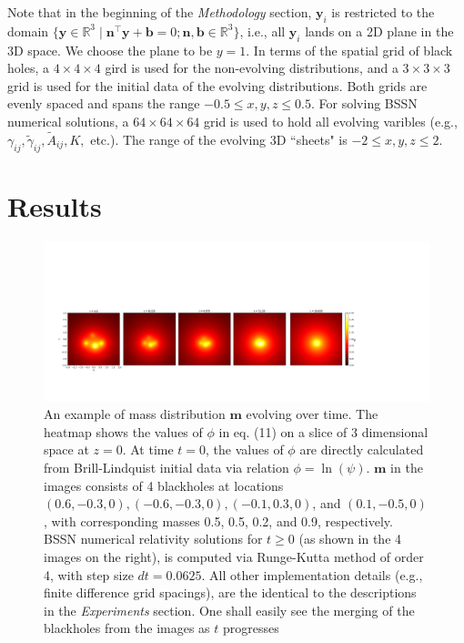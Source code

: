 \documentclass[conference]{IEEEtran}
\begin{document}
Note that in the beginning of the \textit{Methodology} section, $\mathbf{y}_i$ 
is restricted to the domain 
$\{ \mathbf{y} \in \mathbb{R}^3 \mid \mathbf{n}^\top \mathbf{y} + \mathbf{b} = 0; \mathbf{n}, \mathbf{b}\in \mathbb{R}^3\}$, i.e., 
all $\mathbf{y}_i$ lands on a 2D plane in the 3D space. We choose the plane to be 
$y=1$. In terms of the spatial grid of black holes, a $4 \times 4 \times 4$ gird is used for 
the non-evolving distributions, and a $3 \times 3 \times 3$ grid is used for 
the initial data of the evolving distributions. Both grids are evenly spaced 
and spans the range $-0.5 \leq x, y, z \leq 0.5$. For solving BSSN numerical 
solutions, a $64 \times 64 \times 64$ grid is used to hold all evolving varibles 
(e.g., $\gamma_{ij}, \tilde{\gamma}_{ij}, \tilde{A}_{ij}, K,$ etc.). The range 
of the evolving 3D ``sheets" is $-2 \leq x, y, z \leq 2$. 



\section{Results}

\begin{figure}[htbp]
\centering
\includegraphics[width=\textwidth]{Evolution.pdf}
\caption{An example of mass distribution $\mathbf{m}$ evolving 
over time. The heatmap shows the values of $\phi$ in eq. (11) 
on a slice of 3 dimensional space at $z=0$. At time $t=0$, the 
values of $\phi$ are directly calculated from Brill-Lindquist initial 
data via relation $\phi = \ln(\psi)$. $\mathbf{m}$ in the images consists 
of 4 blackholes at locations $(0.6, -0.3, 0), (-0.6, -0.3, 0), 
(-0.1, 0.3, 0)$, and $(0.1, -0.5, 0)$, with corresponding masses 
0.5, 0.5, 0.2, and 0.9, respectively. BSSN numerical relativity solutions 
for $t \geq 0$ (as shown in the 4 images on the right), is computed 
via Runge-Kutta method of order 4, with step size $dt = 0.0625$. All other 
implementation details (e.g., finite difference grid spacings), are the identical 
to the descriptions in the \textit{Experiments} section. 
One shall easily see the merging of the blackholes from the images as 
$t$ progresses}
\label{fig}
\end{figure}
\end{document}
